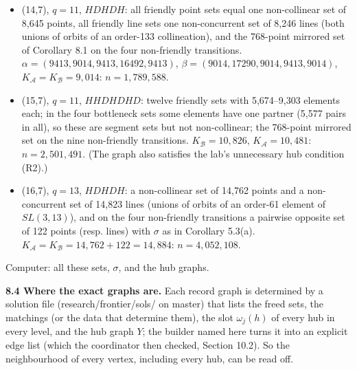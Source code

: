 \documentclass[
  11pt,
]{article}
\providecommand{\tightlist}{%
  \setlength{\itemsep}{0pt}\setlength{\parskip}{0pt}}
\begin{document}
\begin{itemize}
\tightlist
\item
  (14,7), \(q = 11\), \(HDHDH\): all friendly point sets equal one non-collinear set of 8,645 points, all friendly line
  sets one non-concurrent set of 8,246 lines (both unions of orbits of an order-133 collineation), and the 768-point
  mirrored set of Corollary 8.1 on the four non-friendly transitions. \(\alpha = (9413, 9014, 9413, 16492, 9413)\),
  \(\beta = (9014, 17290, 9014, 9413, 9014)\), \(K_{\mathcal A} = K_{\mathcal B} = 9{,}014\): \(n = 1{,}789{,}588\).
\item
  (15,7), \(q = 11\), \(HHDHDHD\): twelve friendly sets with 5,674--9,303 elements each; in the four bottleneck sets
  some elements have one partner (5,577 pairs in all), so these are segment sets but not non-collinear; the 768-point
  mirrored set on the nine non-friendly transitions. \(K_{\mathcal B} = 10{,}826\), \(K_{\mathcal A} = 10{,}481\):
  \(n = 2{,}501{,}491\). (The graph also satisfies the lab's unnecessary hub condition (R2).)
\item
  (16,7), \(q = 13\), \(HDHDH\): a non-collinear set of 14,762 points and a non-concurrent set of 14,823 lines (unions
  of orbits of an order-61 element of \(SL(3,13)\)), and on the four non-friendly transitions a pairwise opposite set of
  122 points (resp. lines) with \(\sigma\) as in Corollary 5.3(a).
  \(K_{\mathcal A} = K_{\mathcal B} = 14{,}762 + 122 = 14{,}884\): \(n = 4{,}052{,}108\).
\end{itemize}

Computer: all these sets, \(\sigma\), and the hub graphs.

\textbf{8.4 Where the exact graphs are.} Each record graph is determined by a solution file (research/frontier/sols/ on
master) that lists the freed sets, the matchings (or the data that determine them), the slot \(\omega_j(h)\) of every
hub in every level, and the hub graph \(Y\); the builder named here turns it into an explicit edge list (which the
coordinator then checked, Section 10.2). So the neighbourhood of every vertex, including every hub, can be read off.
\end{document}
